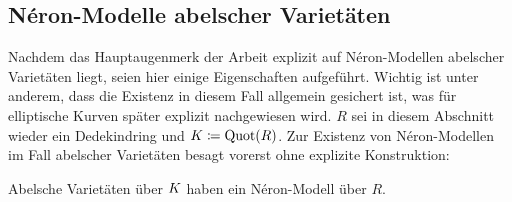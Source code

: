 \subsection{Néron-Modelle abelscher Varietäten}
Nachdem das Hauptaugenmerk der Arbeit explizit auf Néron-Modellen
abelscher Varietäten liegt, seien hier einige Eigenschaften aufgeführt.
Wichtig ist unter anderem, dass die Existenz in diesem Fall allgemein
gesichert ist, was für elliptische Kurven später explizit nachgewiesen
wird.
$R$ sei in diesem Abschnitt wieder ein Dedekindring und
$K\coloneqq\operatorname{Quot}(R)$.
Zur Existenz von Néron-Modellen im Fall abelscher Varietäten besagt
\cite[Corollary~1.3/2]{neron} vorerst ohne explizite Konstruktion:
\begin{Satz}\label{thm:exneronmodellabvarietaet}
  Abelsche Varietäten über $K$ haben ein Néron-Modell über $R$.
\end{Satz}


